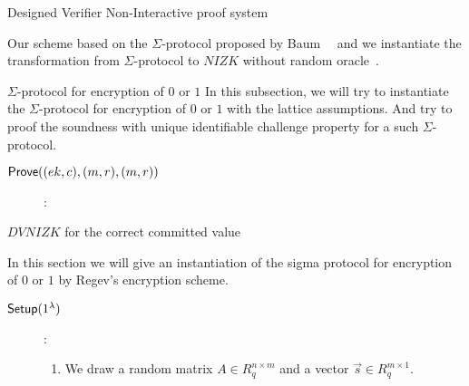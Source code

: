 \begin{section}{Designed Verifier Non-Interactive proof system}

  Our scheme based on the $\Sigma$-protocol proposed by Baum~\etal~\cite{DBLP:journals/iacr/BaumDOP16} and we instantiate the transformation from $\Sigma$-protocol to $NIZK$ without random oracle~\cite{DBLP:conf/pkc/ChaidosG15}.


  \begin{subsection}{$\Sigma$-protocol for encryption of $0$ or $1$}
    In this subsection, we will try to instantiate the $\Sigma$-protocol for encryption of $0$ or $1$ with the lattice assumptions.
    And try to proof the soundness with unique identifiable challenge property for a such $\Sigma$-protocol.
    
    

    \begin{description}
      \item[${\mathsf{Prove}}((ek,c), (m,r), (m, r))$]:
        
    \end{description}


  \end{subsection}


  \begin{subsection}{$DVNIZK$ for the correct committed value}
    
    In this section we will give an instantiation of the sigma protocol  for encryption of $0$ or $1$ by Regev's encryption scheme.

    \begin{description}
    
    \item[${\mathsf{Setup}}(1^\lambda)$]:
      
      \begin{enumerate}
      \item We draw a random matrix $A \in R_q^{n\times m}$ and a vector $\vec{s} \in R_q^{m \times 1}$.
      \end{enumerate}
    \end{description}
  \end{subsection}

\end{section}